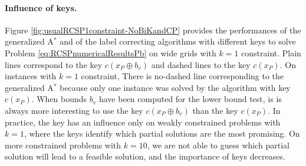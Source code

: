 \documentclass[11pt]{amsart}
\theoremstyle{plain}
\theoremstyle{remark}
\newcommand{\rplus}{\oplus}
\newcommand{\re}{x}
\begin{document}
\paragraph{Influence of keys.} Figure \ref{fig:usualRCSP1constraint-NoBiKandCP} provides the performances of the generalized A$^{*}$ and of the label correcting algorithms with different keys to solve Problem \eqref{eq:RCSPnumericalResultsPb} on wide grids with $k=1$ constraint.  Plain lines correspond to the key $c(\re_{P} \rplus b_{v})$ and dashed lines to the key $c(\re_{P})$. On instances with $k=1$ constraint, There is no-dashed line corresponding to the generalized A$^{*}$ because only one instance was solved by the algorithm with key $c(\re_{P})$. When bounds $b_{v}$ have been computed for the lower bound test, is is always more interesting to use the key $c(\re_{P} \rplus b_{v})$ than the key $c(\re_{P})$. In practice, the key has an influence only on weakly constrained problems with $k=1$, where the keys  identify which partial solutions are the most promising. On more constrained problems with $k=10$, we are not able to guess which partial solution will lead to a feasible solution, and the importance of keys decreases.
\end{document}
